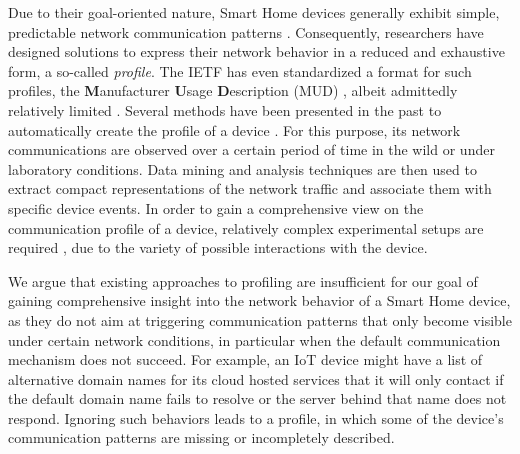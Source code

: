Due to their goal-oriented nature,
Smart Home devices generally exhibit simple, predictable
network communication patterns \cite{sivanathan_classifying_2019}.
Consequently, researchers have designed solutions to express their network behavior
in a reduced and exhaustive form, a so-called \emph{profile}.
The IETF has even standardized a format for such profiles,
the \textbf{M}anufacturer \textbf{U}sage \textbf{D}escription (MUD) \cite{mud},
albeit admittedly relatively limited \cite{matheu_extending_mud_2019, singh_clearer_than_mud_2019, smart-home-firewall}.
Several methods have been presented in the past to automatically create the profile of a device \cite{hamza_clear_2018,ping-pong,homesnitch}. For this purpose, its network communications are observed over a certain period of time in the wild or under laboratory conditions. Data mining and analysis techniques are then used to extract compact representations of the network traffic and associate them with specific device events. In order to gain a comprehensive view on the communication profile of a device, relatively complex experimental setups are required \cite{saidi_haystack_2020, behaviot},
due to the variety of possible interactions with the device.

%
%

We argue that existing approaches to profiling are insufficient for our goal of gaining comprehensive insight into the network behavior of a Smart Home device, as they do not aim at triggering communication patterns that only become visible under certain network conditions, in particular when the default communication mechanism does not succeed.
For example, an IoT device might have a list of alternative domain names for its cloud hosted services that it will only contact if the default domain name fails to resolve or the server behind that name does not respond. Ignoring such behaviors leads to a profile, in which some of the device's communication patterns are missing or incompletely described.

